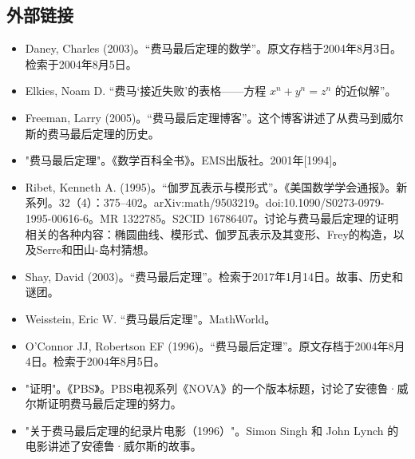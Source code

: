 \subsection{外部链接}
\begin{itemize}
\item Daney, Charles (2003)。“费马最后定理的数学”。原文存档于2004年8月3日。检索于2004年8月5日。  
\item Elkies, Noam D. “费马‘接近失败’的表格——方程 \( x^n + y^n = z^n \) 的近似解”。  
\item Freeman, Larry (2005)。“费马最后定理博客”。这个博客讲述了从费马到威尔斯的费马最后定理的历史。  
\item "费马最后定理"。《数学百科全书》。EMS出版社。2001年[1994]。  
\item Ribet, Kenneth A. (1995)。“伽罗瓦表示与模形式”。《美国数学学会通报》。新系列。32（4）：375–402。arXiv:math/9503219。doi:10.1090/S0273-0979-1995-00616-6。MR 1322785。S2CID 16786407。讨论与费马最后定理的证明相关的各种内容：椭圆曲线、模形式、伽罗瓦表示及其变形、Frey的构造，以及Serre和田山-岛村猜想。  
\item Shay, David (2003)。“费马最后定理”。检索于2017年1月14日。故事、历史和谜团。  
\item Weisstein, Eric W. “费马最后定理”。MathWorld。  
\item O'Connor JJ, Robertson EF (1996)。“费马最后定理”。原文存档于2004年8月4日。检索于2004年8月5日。  
\item "证明"。《PBS》。PBS电视系列《NOVA》的一个版本标题，讨论了安德鲁·威尔斯证明费马最后定理的努力。  
\item "关于费马最后定理的纪录片电影（1996）"。Simon Singh 和 John Lynch 的电影讲述了安德鲁·威尔斯的故事。
\end{itemize}